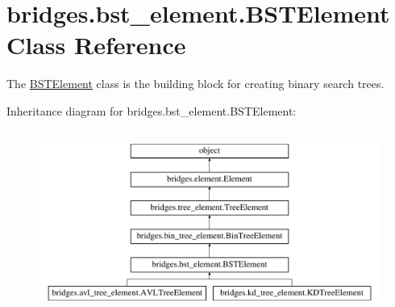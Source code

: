\hypertarget{classbridges_1_1bst__element_1_1_b_s_t_element}{}\section{bridges.\+bst\+\_\+element.\+B\+S\+T\+Element Class Reference}
\label{classbridges_1_1bst__element_1_1_b_s_t_element}


The \mbox{\hyperlink{classbridges_1_1bst__element_1_1_b_s_t_element}{B\+S\+T\+Element}} class is the building block for creating binary search trees.  


Inheritance diagram for bridges.\+bst\+\_\+element.\+B\+S\+T\+Element\+:\begin{figure}[H]
\begin{center}
\leavevmode
\includegraphics[height=6.000000cm]{classbridges_1_1bst__element_1_1_b_s_t_element}
\end{center}
\end{figure}
